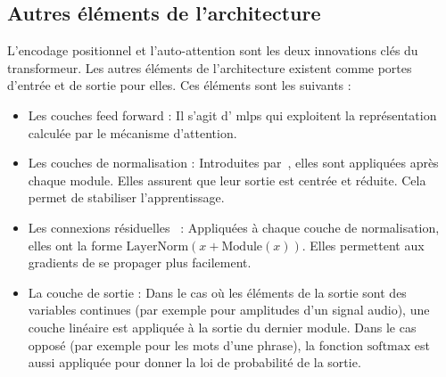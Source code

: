 \subsection{Autres éléments de l'architecture}

L'encodage positionnel et l'auto-attention sont les deux innovations clés du transformeur.
Les autres éléments de l'architecture existent comme portes d'entrée et de sortie pour elles.
Ces éléments sont les suivants :
\begin{itemize}
    \item Les couches \foreignlanguage{english}{feed forward} :
          Il s'agit d' \glspl{mlp} qui exploitent la représentation calculée par le mécanisme d'attention.
    \item Les couches de normalisation :
          Introduites par~\cite{Ba_Kiros_Hinton_2016}, elles sont appliquées après chaque module.
          Elles assurent que leur sortie est centrée et réduite.
          Cela permet de stabiliser l'apprentissage.
    \item Les connexions résiduelles~\cite{He_Zhang_Ren_Sun_2016} :
          Appliquées à chaque couche de normalisation, elles ont la forme 
          \(\mathrm{LayerNorm}\left(x + \mathrm{Module}(x)\right)\).
          Elles permettent aux gradients de se propager plus facilement.
    \item La couche de sortie :
          Dans le cas où les éléments de la sortie sont des variables continues 
          (par exemple pour amplitudes d'un signal audio),
          une couche linéaire est appliquée à la sortie du dernier module.
          Dans le cas opposé (par exemple pour les mots d'une phrase),
          la fonction \(\mathrm{softmax}\) est aussi appliquée pour donner la loi de probabilité de la sortie.
\end{itemize}